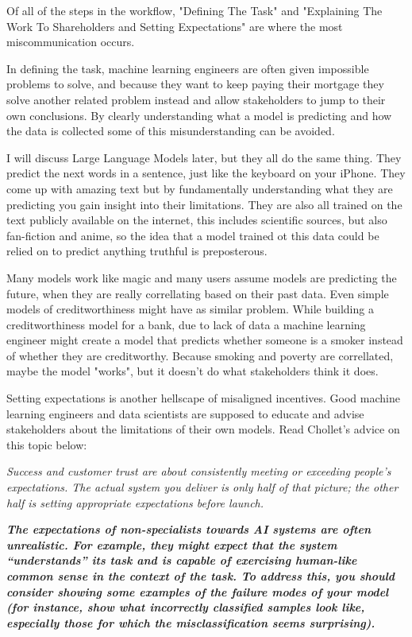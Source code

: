 Of all of the steps in the workflow, "Defining The Task" and "Explaining The Work To Shareholders and Setting Expectations" are where the most miscommunication occurs. 

In defining the task, machine learning engineers are often given impossible problems to solve, and because they want to keep paying their mortgage they solve another related problem instead and allow stakeholders to jump to their own conclusions. By clearly understanding what a model is predicting and how the data is collected some of this misunderstanding can be avoided.

I will discuss Large Language Models later, but they all do the same thing. They predict the next words in a sentence, just like the keyboard on your iPhone. They come up with amazing text but by fundamentally understanding what they are predicting you gain insight into their limitations. They are also all trained on the text publicly available on the internet, this includes scientific sources, but also fan-fiction and anime, so the idea that a model trained ot this data could be relied on to predict anything truthful is preposterous. 

Many models work like magic and many users assume models are predicting the future, when they are really correllating based on their past data. Even simple models of creditworthiness might have as similar problem. While building a creditworthiness model for a bank, due to lack of data a machine learning engineer might create a model that predicts whether someone is a smoker instead of whether they are creditworthy. Because smoking and poverty are correllated, maybe the model "works", but it doesn't do what stakeholders think it does. 

Setting expectations is another hellscape of misaligned incentives. Good machine learning engineers and data scientists are supposed to educate and advise stakeholders about the limitations of their own models. Read Chollet's advice on this topic below:

\textit{Success and customer trust are about consistently meeting or exceeding people’s expectations. The actual system you deliver is only half of that picture; the other half is setting appropriate expectations before launch.}

\textit{\textbf{The expectations of non-specialists towards AI systems are often unrealistic. For example, they might expect that the system “understands” its task and is capable of exercising human-like common sense in the context of the task. To address this, you should consider showing some examples of the failure modes of your model (for instance, show what incorrectly classified samples look like, especially those for which the misclassification seems surprising).}}  


